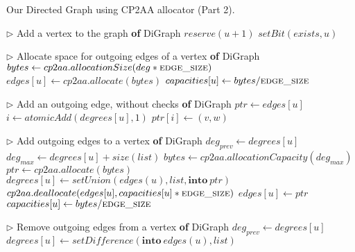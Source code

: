\begin{algorithm}[hbtp]
\caption{Our Directed Graph using CP2AA allocator (Part 2).}
\label{alg:digraph2}
\begin{algorithmic}[1]
\State $\rhd$ Add a vertex to the graph
 \textbf{of} DiGraph \label{alg:digraph--add-vertex-begin}
   $reserve(u + 1)$
  \EndIf
  \State $setBit(exists, u)$
\EndFunction \label{alg:digraph--add-vertex-end}

\Statex

\State $\rhd$ Allocate space for outgoing edges of a vertex
 \textbf{of} DiGraph \label{alg:digraph--allocate-edges-begin}
   \ReturnInline{}
  \EndIf
  \State $bytes \gets cp2aa.allocationSize(deg * \textsc{edge\_size})$
  \State $edges[u] \gets cp2aa.allocate(bytes)$
  \State $capacities[u] \gets bytes / \textsc{edge\_size}$
\EndFunction \label{alg:digraph--allocate-edges-end}

\Statex

\State $\rhd$ Add an outgoing edge, without checks
 \textbf{of} DiGraph \label{alg:digraph--add-edge-unsafe-begin}
  \State $ptr \gets edges[u]$
  \State $i \gets atomicAdd(degrees[u], 1)$
  \State $ptr[i] \gets (v, w)$
\EndFunction \label{alg:digraph--add-edge-unsafe-end}

\Statex

\State $\rhd$ Add outgoing edges to a vertex
 \textbf{of} DiGraph \label{alg:digraph--add-edges-begin}
   
  \EndIf
  \State $deg_{prev} \gets degrees[u]$
  \State $deg_{max} \gets degrees[u] + size(list)$
  \State $bytes \gets cp2aa.allocationCapacity(deg_{max})$
  \State $ptr \gets cp2aa.allocate(bytes)$
  \State $degrees[u] \gets \textit{setUnion}(edges(u), list, \textbf{into}\ ptr)$
  \State $cp2aa.deallocate(edges[u], capacities[u] * \textsc{edge\_size})$
  \State $edges[u] \gets ptr$
  \State $capacities[u] \gets bytes / \textsc{edge\_size}$
\EndFunction \label{alg:digraph--add-edges-end}

\Statex

\State $\rhd$ Remove outgoing edges from a vertex
 \textbf{of} DiGraph \label{alg:digraph--remove-edges-begin}
   
  \EndIf
  \State $deg_{prev} \gets degrees[u]$
  \State $degrees[u] \gets \textit{setDifference}(\textbf{into}\ edges(u), list)$
\EndFunction \label{alg:digraph--remove-edges-end}


\end{algorithmic}
\end{algorithm}

